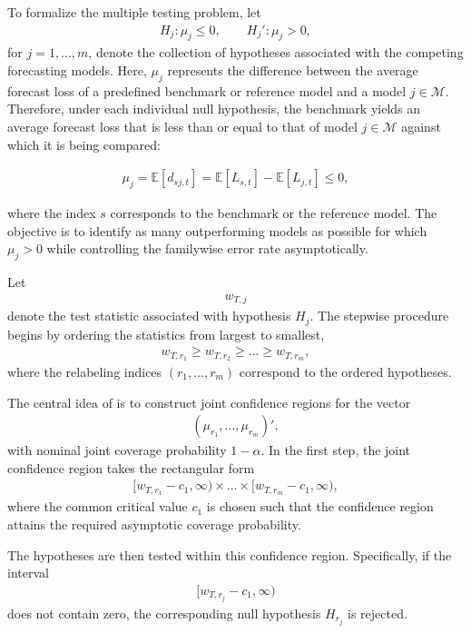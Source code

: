 \documentclass{article} %
\begin{document}
	To formalize the multiple testing problem, let
	\begin{align}
		H_j : \mu_j \leq 0,
		\qquad
		H_j' : \mu_j > 0,
	\end{align}
	for $j = 1,\dots,m$, denote the collection of hypotheses associated with the competing forecasting models. Here, $\mu_j$ represents the difference between the average forecast loss of a predefined benchmark or reference model and a model $j \in \mathcal{M}$. Therefore, under each individual null hypothesis, the benchmark yields an average forecast loss that is less than or equal to that of model $j \in \mathcal{M}$ against which it is being compared:
	
	\begin{align}
		\mu_j = \mathbb{E}[d_{sj,t}] = \mathbb{E}[L_{s,t}] - \mathbb{E}[L_{j,t}] \leq 0,
	\end{align}
	
	where the index $s$ corresponds to the benchmark or the reference model. The objective is to identify as many outperforming models as possible for which $\mu_j > 0$ while controlling the familywise error rate asymptotically.
	
	Let
	\begin{align}
		w_{T,j}
	\end{align}
	denote the test statistic associated with hypothesis $H_j$. The stepwise procedure begins by ordering the statistics from largest to smallest,
	\begin{align}
		w_{T,r_1}
		\geq
		w_{T,r_2}
		\geq
		\dots
		\geq
		w_{T,r_m},
	\end{align}
	where the relabeling indices $(r_1,\dots,r_m)$ correspond to the ordered hypotheses.
	
	The central idea of \textcite{ROMANOWOLF2005} is to construct joint confidence regions for the vector
	\begin{align}
		(\mu_{r_1},\dots,\mu_{r_m})',
	\end{align}
	with nominal joint coverage probability $1-\alpha$. In the first step, the joint confidence region takes the rectangular form
	\begin{align}
		[w_{T,r_1}-c_1,\infty)
		\times
		\dots
		\times
		[w_{T,r_m}-c_1,\infty),  \label{eq:stepm_raw_cr}
	\end{align}
	where the common critical value $c_1$ is chosen such that the confidence region attains the required asymptotic coverage probability.
	
	The hypotheses are then tested within this confidence region. Specifically, if the interval
	\begin{align}
		[w_{T,r_j}-c_1,\infty)
	\end{align}
	does not contain zero, the corresponding null hypothesis $H_{r_j}$ is rejected.
	
\end{document}
